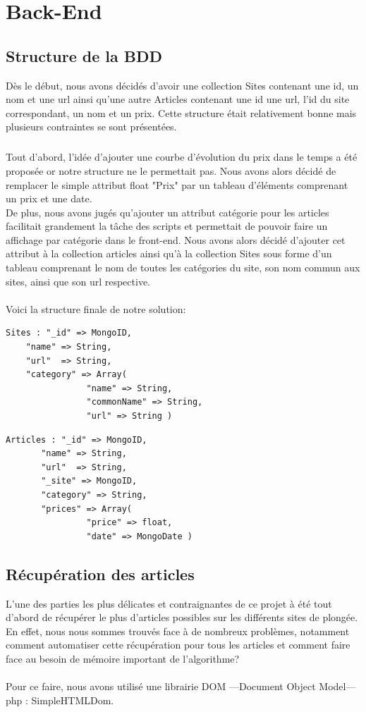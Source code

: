 \documentclass{report}
\begin{document}
\chapter{Back-End}
\section{Structure de la BDD}
Dès le début, nous avons décidés d'avoir une collection Sites contenant une id, un nom et une url ainsi qu'une autre Articles contenant une id une url, l'id du site correspondant, un nom et un prix.
Cette structure était relativement bonne mais plusieurs contraintes se sont présentées.\\
\paragraph{}
Tout d'abord, l'idée d'ajouter une courbe d'évolution du prix dans le temps a été proposée or notre structure ne le permettait pas. Nous avons alors décidé de remplacer le simple attribut float "Prix" par un tableau d'éléments comprenant un prix et une date.\\
De plus, nous avons jugés qu'ajouter un attribut catégorie pour les articles facilitait grandement la tâche des scripts et permettait de pouvoir faire un affichage par catégorie dans le front-end. Nous avons alors décidé d'ajouter cet attribut à la collection articles ainsi qu'à la collection Sites sous forme d'un tableau comprenant le nom de toutes les catégories du site, son nom commun aux sites, ainsi que son url respective.\\\\
Voici la structure finale de notre solution:
\begin{lstlisting}
Sites :	"_id" => MongoID,
	"name" => String,
	"url"  => String,
	"category" => Array(
				"name" => String,
				"commonName" => String,
				"url" => String )
\end{lstlisting}
\newpage
\begin{lstlisting}							
Articles : "_id" => MongoID,
	   "name" => String,
	   "url"  => String,
	   "_site" => MongoID,
	   "category" => String,
	   "prices"	=> Array(
				"price" => float,
				"date" => MongoDate )
\end{lstlisting}

\section{Récupération des articles}
L'une des parties les plus délicates et contraignantes de ce projet à été tout d'abord de récupérer le plus d'articles possibles sur les différents sites de plongée.\\
En effet, nous nous sommes trouvés face à de nombreux problèmes, notamment comment automatiser cette récupération pour tous les articles et comment faire face au besoin de mémoire important de l'algorithme?\\\\
Pour ce faire, nous avons utilisé une librairie DOM —Document Object Model— php : SimpleHTMLDom.\\
\end{document}
